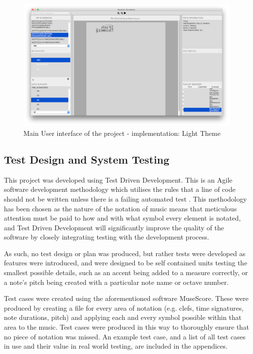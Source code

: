 \begin{figure}[H]
	\centering
    \includegraphics[width=400pt]{designs/main_light.png}
    \caption{Main User interface of the project - implementation: Light Theme}
    \label{fig:main_light}
\end{figure}
\subsection{Test Design and System Testing}
This project was developed using Test Driven Development. This is an Agile software development methodology which utilises the rules that a line of code should not be written unless there is a failing automated test \parencite{TDD}. This methodology has been chosen as the nature of the notation of music means that meticulous attention must be paid to how and with what symbol every element is notated, and Test Driven Development will significantly improve the quality of the software by closely integrating testing with the development process.

As such, no test design or plan was produced, but rather tests were developed as features were introduced, and were designed to be self contained units testing the smallest possible details, such as an accent being added to a measure correctly, or a note's pitch being created with a particular note name or octave number.

Test cases were created using the aforementioned software MuseScore. These were produced by creating a file for every area of notation (e.g. clefs, time signatures, note durations, pitch) and applying each and every symbol possible within that area to the music. Test cases were produced in this way to thoroughly ensure that no piece of notation was missed. An example test case, and a list of all test cases in use and their value in real world testing, are included in the appendices.

